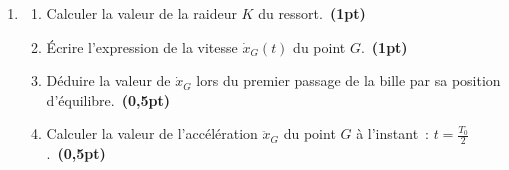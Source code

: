 \hfill
\begin{minipage}{0.36\linewidth}
    \begin{figure}[H]
        \centering
        
        \caption{}
        \label{fig:solide_ressort_bille}
    \end{figure}
    \begin{figure}[H]
        \centering
        \caption{}
        \label{fig:2bac_svt_national_arabe_2011_normale_phys_ex3_2}
    \end{figure}
\end{minipage}

\begin{enumerate}[resume=x]
    \item[]
          \begin{enumerate}[resume=y]
              \item Calculer la valeur de la raideur $K$ du
                    ressort.~\textbf{(1pt)}
              \item Écrire l'expression de la vitesse $\dot{x}_G(t)$ du point
                    $G$.~\textbf{(1pt)}
              \item Déduire la valeur de $\dot{x}_G$ lors du premier passage de
                    la bille par sa position d'équilibre.~\textbf{(0,5pt)}
              \item Calculer la valeur de l'accélération $\ddot{x}_G$ du point
                    $G$ à l'instant~: $t=\frac{T_0}{2}$.~\textbf{(0,5pt)}
          \end{enumerate}
\end{enumerate}
